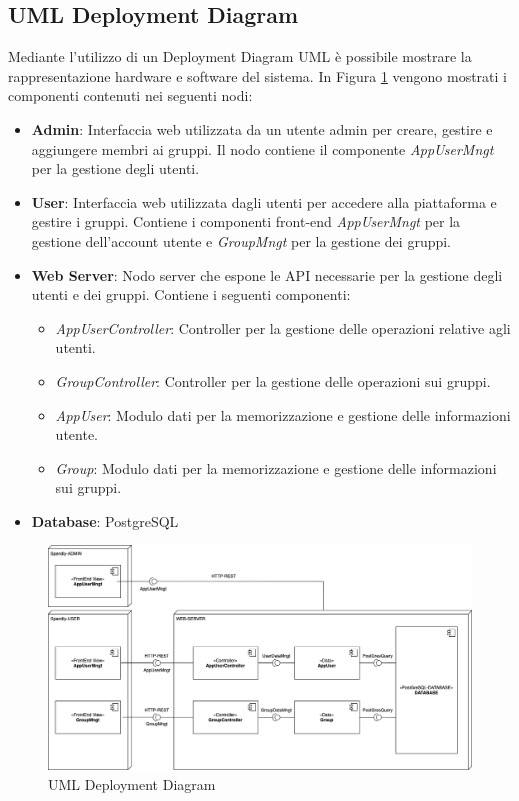 \subsection{UML Deployment Diagram}
Mediante l’utilizzo di un Deployment Diagram UML è possibile mostrare la rappresentazione hardware e software del sistema. In Figura \ref{fig:uml-deployment-diagram} vengono mostrati i componenti contenuti nei seguenti nodi:


\begin{itemize}
    \item \textbf{Admin}: Interfaccia web utilizzata da un utente admin per creare, gestire e aggiungere membri ai gruppi. Il nodo contiene il componente \textit{AppUserMngt} per la gestione degli utenti.
    
    \item \textbf{User}: Interfaccia web utilizzata dagli utenti per accedere alla piattaforma e gestire i gruppi. Contiene i componenti front-end \textit{AppUserMngt} per la gestione dell'account utente e \textit{GroupMngt} per la gestione dei gruppi.
    
    \item \textbf{Web Server}: Nodo server che espone le API necessarie per la gestione degli utenti e dei gruppi. Contiene i seguenti componenti:
    \begin{itemize}
        \item \textit{AppUserController}: Controller per la gestione delle operazioni relative agli utenti.
        \item \textit{GroupController}: Controller per la gestione delle operazioni sui gruppi.
        \item \textit{AppUser}: Modulo dati per la memorizzazione e gestione delle informazioni utente.
        \item \textit{Group}: Modulo dati per la memorizzazione e gestione delle informazioni sui gruppi.
    \end{itemize}
    
    \item \textbf{Database}: PostgreSQL
\end{itemize}

\begin{figure}[H]
    \centering
    \includegraphics[width=1.1\textwidth, trim=3cm 0cm 1cm 0cm]{images/DeployementDiagramIterazione1.drawio.png}
    \caption{UML Deployment Diagram}
    \label{fig:uml-deployment-diagram}
\end{figure}

